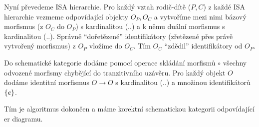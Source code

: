 Nyní převedeme ISA hierarchie.
Pro každý vztah rodič-dítě ($P, C$) z každé ISA hierarchie vezmeme odpovídající objekty $O_P, O_C$ a vytvoříme mezi nimi bázový morfismus (z $O_C$ do $O_P$) s kardinalitou (\one{}..\one{}) a k němu duální morfismus s kardinalitou (\one{}..\one{}).
Správně \enquote{dořetězené} identifikátory (zřetězené přes právě vytvořený morfismus) z $O_P$ vložíme do $O_C$.
Tím $O_C$ \enquote{zdědil} identifikátory od $O_P$.

Do schematické kategorie dodáme pomocí operace skládání morfismů $\circ$ všechny odvozené morfismy chybějící do tranzitivního uzávěru.
Pro každý objekt $O$ dodáme identitní morfismus $O\to O$ s kardinalitou (\one{}..\one{}) a množinou identifikátorů $\left\{e\right\}$.

Tím je algoritmus dokončen a máme korektní schematickou kategorii odpovídající \acrshort{er} diagramu.
